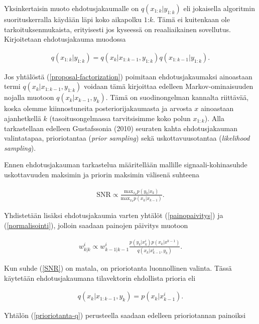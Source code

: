 \documentclass[
  12pt,
  a4paper, twoside]{book}
\begin{document}
Yksinkertaisin muoto ehdotusjakaumalle on \(q(x_{1:k}|y_{1:k})\) eli jokaisella algoritmin suorituskerralla käydään läpi koko aikapolku \(1\):\(k\). Tämä ei kuitenkaan ole tarkoituksenmukaista, erityisesti jos kyseessä on reaaliaikainen sovellutus. Kirjoitetaan ehdotusjakauma muodossa

\begin{align}\label{proposal-factorization}
q(x_{1:k}|y_{1:k})=q(x_k|x_{1:k-1},y_{1:k})q(x_{1:k-1}|y_{1:k}).
\end{align}

Jos yhtälöstä (\ref{proposal-factorization}) poimitaan ehdotusjakaumaksi ainoastaan termi \(q(x_k|x_{1:k-1},y_{1:k})\) voidaan tämä kirjoittaa edelleen Markov-ominaisuuden nojalla muotoon \(q(x_k|x_{k-1},y_{k})\). Tämä on suodinongelman kannalta riittävää, koska olemme kiinnostuneita posteriorijakaumasta ja arvosta \(x\) ainoastaan ajanhetkellä \(k\) (tasoitusongelmassa tarvitsisimme koko polun \(x_{1:k}\)). Alla tarkastellaan edelleen Gustafssonia (2010) \citep{gustafsson-2010} seuraten kahta ehdotusjakauman valintatapaa, prioriotantaa (\emph{prior sampling}) sekä uskottavuusotantaa (\emph{likelihood sampling}).

Ennen ehdotusjakauman tarkastelua määritellään mallille signaali-kohinasuhde uskottavuuden maksimin ja priorin maksimin välisenä suhteena

\begin{align}\label{SNR}
\text{SNR}\propto \frac{\text{max}_{x_k}p(y_k|x_k)}{\text{max}_{x_k}p(x_k|x_{k-1})}. 
\end{align}

\noindent Yhdistetään lisäksi ehdotusjakaumia varten yhtälöt (\ref{painopaivitys}) ja (\ref{normalisointi}), jolloin saadaan painojen päivitys muotoon

\begin{align}\label{painopaivitys-propto}
w^i_{k|k} \propto w^i_{k-1|k-1}\frac{p(y_k|x^i_k)p(x_k|x^{k-1})}{q(x_k|x^i_{k-1},y_k)}.
\end{align}

Kun suhde (\ref{SNR}) on matala, on prioriotanta luonnollinen valinta. Tässä käytetään ehdotusjakaumana tilavektorin ehdollista prioria eli

\begin{align}\label{prioriotanta-q}
q(x_k|x_{1:k-1},y_{k})=p(x_k|x^i_{k-1}).
\end{align}

\noindent Yhtälön (\ref{prioriotanta-q}) perusteella saadaan edelleen prioriotannan painoiksi
\end{document}
